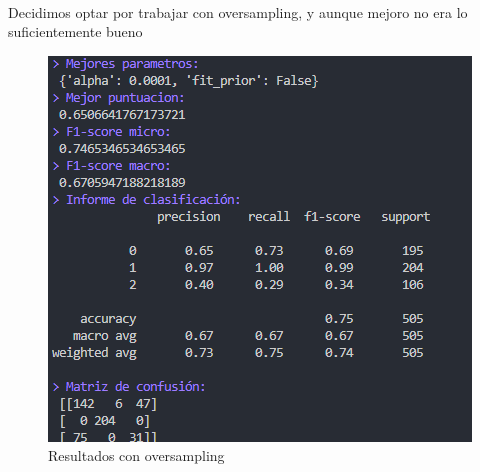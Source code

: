 \documentclass{report}
\begin{document}
{{                \paragraph*{}{
                    Decidimos optar por trabajar con oversampling, y aunque mejoro no era lo suficientemente bueno \color{orange}{Puntuacion media:}
                }
                \begin{figure}[H]
                    \centering
                    \includegraphics[width=\textwidth]{img/oversampling.png}
                    \caption{Resultados con oversampling}
                \end{figure}
}}
\end{document}
